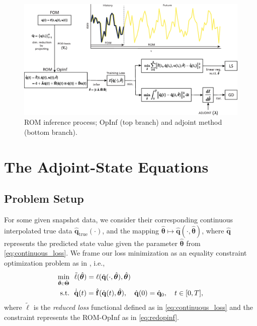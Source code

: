 \begin{figure}[h!]\centering
    \includegraphics[width=.96\textwidth]{figures/intro_rom.eps}
    \caption{ROM inference process; OpInf (top branch) and adjoint method (bottom branch).}
    \label{fig:intro_rom1}
\end{figure}



\section{The Adjoint-State Equations}
\label{sec:adjoint_eqs}

\subsection*{Problem Setup}

For some given snapshot data, we consider their corresponding continuous interpolated true data $\hat{\mathbf{q}}_{\text{true}}(\cdot)$, and the mapping $\hat{\bm{\theta}}\mapsto \hat{\mathbf{q}}(\cdot,\hat{\bm{\theta}})$, where $\hat{\mathbf{q}}$ represents the predicted state value given the parameter $\hat{\bm{\theta}}$ from \eqref{eq:continuous_loss}. We frame our loss minimization as an equality constraint optimization problem as in \cite{bradley2024pde}, i.e.,\\
\begin{align}
    \underset{\hat{\bm{\theta}} \scalebox{0.67}{$\in$} \hat{\bm{\Theta}}}{\mathrm{min}} ~~&\tilde{\ell}(\hat{\bm{\theta}}) = \ell (\hat{\mathbf{q}}(\cdot,\hat{\bm{\theta}}),\hat{\bm{\theta}})\notag\\
    \mathrm{s.t.}~~&\dot{\hat{\mathbf{q}}}(t) = \hat{\mathbf{f}}(\hat{\mathbf{q}}(t),\hat{\bm{\theta}}), \quad\hat{\mathbf{q}}(0)=\hat{\mathbf{q}}_0, \quad t\in[0,T],
    \label{eq:opt_problem}
\end{align}
where $\tilde{\ell}$ is the \textit{reduced loss} functional defined as in \eqref{eq:continuous_loss} and the constraint represents the ROM-OpInf as in \eqref{eq:redopinf}.

